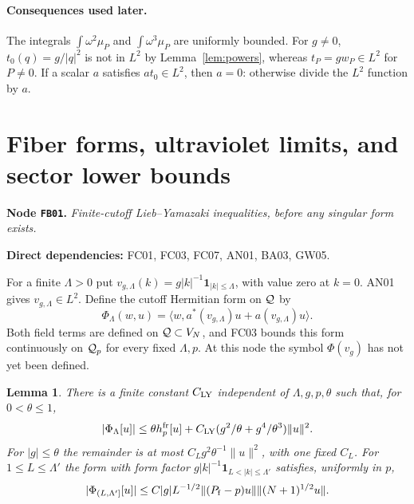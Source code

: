 \documentclass[11pt,a4paper]{article}
\newtheorem{lemma}[theorem]{Lemma}
\theoremstyle{remark}\newtheorem{remark}[theorem]{Remark}
\newcommand{\abs}[1]{\lvert #1\rvert}\newcommand{\rankone}[2]{\lvert #1\rangle\langle #2\rvert}
\newcommand{\node}[3]{\par\Needspace{6\baselineskip}\smallskip\hypertarget{node:#1}{}\label{nodepage:#1}\noindent\textbf{Node \texttt{#1}.} \textit{#2.}\par\noindent\textbf{Direct dependencies:} #3.\par}
\begin{document}
\paragraph{Consequences used later.}
The integrals $\int\omega^2\mu_P$ and $\int\omega^3\mu_P$ are uniformly bounded. For $g\ne0$, $t_0(q)=g/\abs q^2$ is not in $L^2$ by Lemma~\ref{lem:powers}, whereas $t_P=g w_P\in L^2$ for $P\ne0$. If a scalar $a$ satisfies $a t_0\in L^2$, then $a=0$: otherwise divide the $L^2$ function by $a$.

\section{Fiber forms, ultraviolet limits, and sector lower bounds}\label{sec:forms}
\node{FB01}{Finite-cutoff Lieb--Yamazaki inequalities, before any singular form exists}{FC01, FC03, FC07, AN01, BA03, GW05}
For a finite $\Lambda>0$ put $v_{g,\Lambda}(k)=g|k|^{-1}\mathbf1_{|k|\leq\Lambda}$, with value zero at $k=0$. AN01 gives $v_{g,\Lambda}\in L^2$. Define the cutoff Hermitian form on $\mathcal Q$ by
\[
 \Phi_\Lambda(w,u)=\langle w,a^*(v_{g,\Lambda})u+a(v_{g,\Lambda})u\rangle.
\]
Both field terms are defined on $\mathcal Q\subset V_N$, and FC03 bounds this form continuously on $\mathcal Q_p$ for every fixed $\Lambda,p$. At this node the symbol $\Phi(v_g)$ has not yet been defined.
\begin{lemma}\label{lem:lycutoff}
There is a finite constant $C_{\rm LY}$ independent of $\Lambda,g,p,\theta$ such that, for $0<\theta\leq1$,
\[
 |\Phi_\Lambda[u]|\leq\theta h_p^{\rm fr}[u]
       +C_{\rm LY}(g^2/\theta+g^4/\theta^3)\|u\|^2.
\]
For $|g|\leq\theta$ the remainder is at most $C_Lg^2\theta^{-1}\|u\|^2$, with one fixed $C_L$. For $1\leq L\leq\Lambda'$ the form with form factor
$g|k|^{-1}\mathbf1_{L<|k|\leq\Lambda'}$ satisfies, uniformly in $p$,
\begin{equation}
 |\Phi_{(L,\Lambda']}[u]|
 \leq C|g|L^{-1/2}\| (P_{\rm f}-p)u\|
                  \|(N+1)^{1/2}u\|.
 \label{eq:finite-tail-preyoung}
\end{equation}
\end{lemma}
\end{document}
